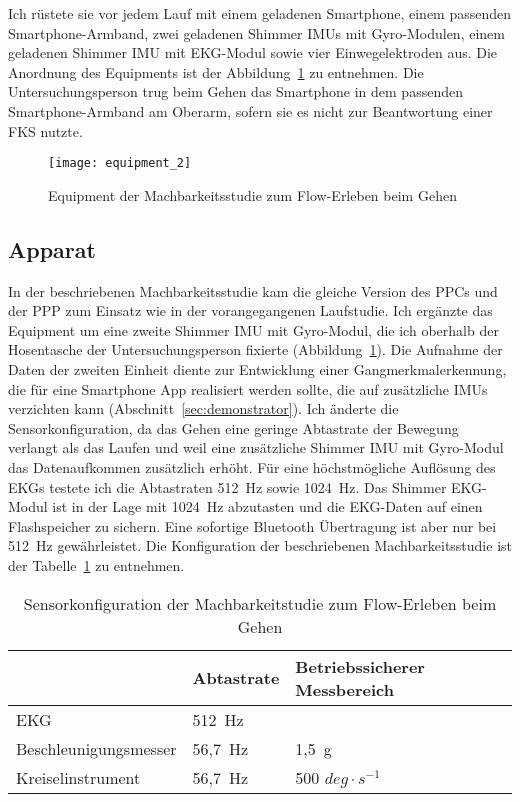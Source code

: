 Ich rüstete sie vor jedem Lauf mit einem geladenen Smartphone, einem passenden Smartphone-Armband, zwei geladenen Shimmer \acp{IMU} mit Gyro-Modulen, einem geladenen Shimmer \ac{IMU} mit EKG-Modul sowie vier Einwegelektroden aus. Die Anordnung des Equipments ist der Abbildung~\ref{fig:equipment_2} zu entnehmen. Die Untersuchungsperson trug beim Gehen das Smartphone in dem passenden Smartphone-Armband am Oberarm, sofern sie es nicht zur Beantwortung einer \ac{FKS} nutzte. 
\begin{figure}
	[!htb] \centering 
	\texttt{[image: equipment\_2]} \caption[Equipment der Machbarkeitsstudie zum Flow-Erleben beim Gehen]{Equipment der Machbarkeitsstudie zum Flow-Erleben beim Gehen} \label{fig:equipment_2} 
\end{figure}

\subsection{Apparat} 

\label{sub:apparat_5_2}

In der beschriebenen Machbarkeitsstudie kam die gleiche Version des \ac{PPC}s und der \ac{PPP} zum Einsatz wie in der vorangegangenen Laufstudie. Ich ergänzte das Equipment um eine zweite Shimmer \ac{IMU} mit Gyro-Modul, die ich oberhalb der Hosentasche der Untersuchungsperson fixierte (Abbildung~\ref{fig:equipment_2}). Die Aufnahme der Daten der zweiten Einheit diente zur Entwicklung einer Gangmerkmalerkennung, die für eine Smartphone App realisiert werden sollte, die auf zusätzliche \acp{IMU} verzichten kann (Abschnitt~\ref{sec:demonstrator}). Ich änderte die Sensorkonfiguration, da das Gehen eine geringe Abtastrate der Bewegung verlangt als das Laufen und weil eine zusätzliche Shimmer \ac{IMU} mit Gyro-Modul das Datenaufkommen zusätzlich erhöht. Für eine höchstmögliche Auflösung des \ac{EKG}s testete ich die Abtastraten 512~Hz sowie 1024~Hz. Das Shimmer EKG-Modul ist in der Lage mit 1024~Hz abzutasten und die \ac{EKG}-Daten auf einen Flashspeicher zu sichern. Eine sofortige Bluetooth Übertragung ist aber nur bei 512~Hz gewährleistet. Die Konfiguration der beschriebenen Machbarkeitsstudie ist der Tabelle~\ref{tab:sensorkonfiguration_2} zu entnehmen. 
\begin{table}
	[!htb] \caption[Sensorkonfiguration der Machbarkeitstudie zum Flow-Erleben beim Gehen]{Sensorkonfiguration der Machbarkeitstudie zum Flow-Erleben beim Gehen} \label{tab:sensorkonfiguration_2} 
	\begin{tabularx}
		{ 
		\textwidth}{p{} p{} p{}} \toprule & Abtastrate & Betriebssicherer Messbereich \\
		\midrule EKG & 512~Hz & \\
		Beschleunigungsmesser & 56,7~Hz & 1,5~g \\
		Kreiselinstrument & 56,7~Hz & 500 $deg \cdot s^{-1}$ \\
		\bottomrule 
	\end{tabularx}
\end{table}

